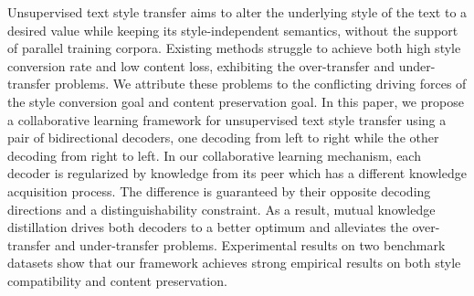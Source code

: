 Unsupervised text style transfer aims to alter the underlying style of the text to a desired value while keeping its style-independent semantics, without the support of parallel training corpora. Existing methods struggle to achieve both high style conversion rate and low content loss, exhibiting the over-transfer and under-transfer problems. We attribute these problems to the conflicting driving forces of the style conversion goal and content preservation goal. In this paper, we propose a collaborative learning framework for unsupervised text style transfer using a pair of bidirectional decoders, one decoding from left to right while the other decoding from right to left. In our collaborative learning mechanism, each decoder is regularized by knowledge from its peer which has a different knowledge acquisition process. The difference is guaranteed by their opposite decoding directions and a distinguishability constraint. As a result, mutual knowledge distillation drives both decoders to a better optimum and alleviates the over-transfer and under-transfer problems. Experimental results on two benchmark datasets show that our framework achieves strong empirical results on both style compatibility and content preservation.

